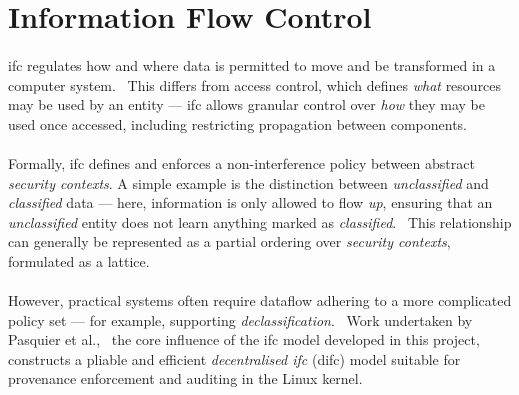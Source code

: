 



\section{Information Flow Control}
\label{sec:ifc}

\paragraph{} \acrshort{ifc} regulates how and where data is permitted to move and be transformed in a computer system.~\cite{ifc-data-prop} This differs from access control, which defines \textit{what} resources may be used by an entity --- \acrshort{ifc} allows granular control over \textit{how} they may be used once accessed, including restricting propagation between components. 

\paragraph{} Formally, \acrshort{ifc} defines and enforces a non-interference policy between abstract \textit{security contexts}. A simple example is the distinction between \textit{unclassified} and \textit{classified} data --- here, information is only allowed to flow \textit{up}, ensuring that an \textit{unclassified} entity does not learn anything marked as \textit{classified}.~\cite{Bell1973SecureCS} This relationship can generally be represented as a partial ordering over \textit{security contexts}, formulated as a lattice.~\cite{ifc-lattice}

\paragraph{} However, practical systems often require dataflow adhering to a more complicated policy set --- for example, supporting \textit{declassification}.~\cite{10.5555/794199.795122} Work undertaken by Pasquier et al.,~\cite{camflow} the core influence of the \acrshort{ifc} model developed in this project, constructs a pliable and efficient \textit{decentralised \acrshort{ifc}} (\acrshort{difc}) model suitable for provenance enforcement and auditing in the Linux kernel.

